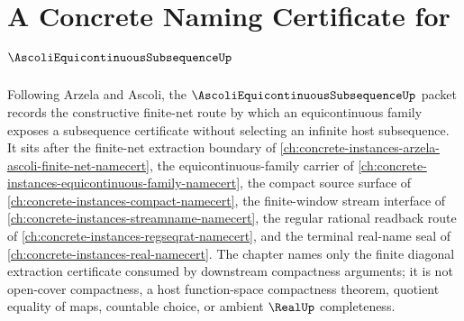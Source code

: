 \chapter{A Concrete Naming Certificate for $\AscoliEquicontinuousSubsequenceUp$}
\label{ch:concrete-instances-ascoli-equicontinuous-subsequence-namecert}

Following Arzela and Ascoli, the $\AscoliEquicontinuousSubsequenceUp$ packet records the constructive finite-net route by which an equicontinuous family exposes a subsequence certificate without selecting an infinite host subsequence. It sits after the finite-net extraction boundary of \autoref{ch:concrete-instances-arzela-ascoli-finite-net-namecert}, the equicontinuous-family carrier of \autoref{ch:concrete-instances-equicontinuous-family-namecert}, the compact source surface of \autoref{ch:concrete-instances-compact-namecert}, the finite-window stream interface of \autoref{ch:concrete-instances-streamname-namecert}, the regular rational readback route of \autoref{ch:concrete-instances-regseqrat-namecert}, and the terminal real-name seal of \autoref{ch:concrete-instances-real-namecert}. The chapter names only the finite diagonal extraction certificate consumed by downstream compactness arguments; it is not open-cover compactness, a host function-space compactness theorem, quotient equality of maps, countable choice, or ambient $\RealUp$ completeness.

